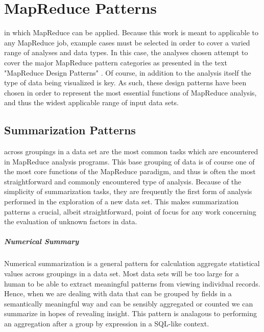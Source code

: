 \chapter{MapReduce Patterns}
\label{sec:mapreducepatterns}
 in which MapReduce can be applied. Because this work is meant to applicable to any MapReduce job, example cases must be selected in order to cover a varied range of analyses and data types. In this case, the analyses chosen attempt to cover the major MapReduce pattern categories as presented in the text "MapReduce Design Patterns" \citep{Miner2012}. Of course, in addition to the analysis itself the type of data being visualized is key. As such, these design patterns have been chosen in order to represent the most essential functions of MapReduce analysis, and thus the widest applicable range of input data sets.

\section{Summarization Patterns}
\label{sec:summarization}
 across groupings in a data set are the most common tasks which are encountered in MapReduce analysis programs. This base grouping of data is of course one of the most core functions of the MapReduce paradigm, and thus is often the most straightforward and commonly encountered type of analysis. Because of the simplicity of summarization tasks, they are frequently the first form of analysis performed in the exploration of a new data set. This makes summarization patterns a crucial, albeit straightforward, point of focus for any work concerning the evaluation of unknown factors in data.

\paragraph{Numerical Summary}
Numerical summarization is a general pattern for calculation aggregate statistical values across groupings in a data set. Most data sets will be too large for a human to be able to extract meaningful patterns from viewing individual records. Hence, when we are dealing with data that can be grouped by fields in a semantically meaningful way and can be sensibly aggregated or counted we can summarize in hopes of revealing insight. This pattern is analagous to performing an aggregation after a group by expression in a SQL-like context.


